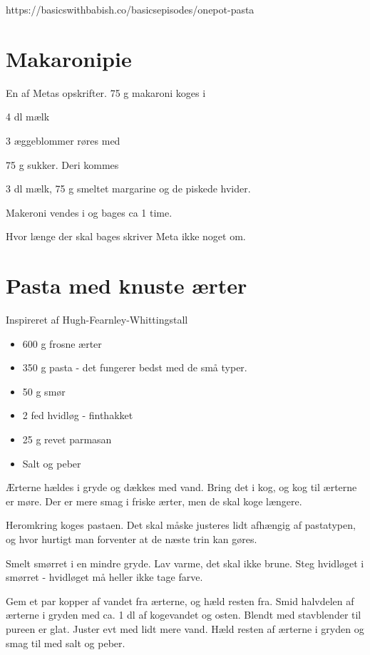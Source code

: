 \documentclass[
  letterpaper,
  DIV=11,
  numbers=noendperiod]{scrreprt}
\providecommand{\tightlist}{%
  \setlength{\itemsep}{0pt}\setlength{\parskip}{0pt}}\usepackage{longtable,booktabs,array}
\begin{document}
https://basicswithbabish.co/basicsepisodes/onepot-pasta

\hypertarget{makaronipie}{%
\section{Makaronipie}\label{makaronipie}}

En af Metas opskrifter. 75 g makaroni koges i

4 dl mælk

3 æggeblommer røres med

75 g sukker. Deri kommes

3 dl mælk, 75 g smeltet margarine og de piskede hvider.

Makeroni vendes i og bages ca 1 time.

Hvor længe der skal bages skriver Meta ikke noget om.

\hypertarget{pasta-med-knuste-uxe6rter}{%
\section{Pasta med knuste ærter}\label{pasta-med-knuste-uxe6rter}}

Inspireret af Hugh-Fearnley-Whittingstall

\begin{itemize}
\tightlist
\item
  600 g frosne ærter
\item
  350 g pasta - det fungerer bedst med de små typer.
\item
  50 g smør
\item
  2 fed hvidløg - finthakket
\item
  25 g revet parmasan
\item
  Salt og peber
\end{itemize}

Ærterne hældes i gryde og dækkes med vand. Bring det i kog, og kog til
ærterne er møre. Der er mere smag i friske ærter, men de skal koge
længere.

Heromkring koges pastaen. Det skal måske justeres lidt afhængig af
pastatypen, og hvor hurtigt man forventer at de næste trin kan gøres.

Smelt smørret i en mindre gryde. Lav varme, det skal ikke brune. Steg
hvidløget i smørret - hvidløget må heller ikke tage farve.

Gem et par kopper af vandet fra ærterne, og hæld resten fra. Smid
halvdelen af ærterne i gryden med ca. 1 dl af kogevandet og osten.
Blendt med stavblender til pureen er glat. Juster evt med lidt mere
vand. Hæld resten af ærterne i gryden og smag til med salt og peber.
\end{document}
